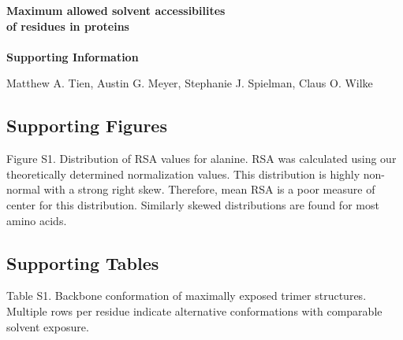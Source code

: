 \documentclass[12pt]{article}
\begin{document}
\begin{center}
\Large\textbf{Maximum allowed solvent accessibilites\\of residues in proteins}\\
\large\mbox{}\\
\textbf{Supporting Information}
\end{center}

\bigskip
\begin{center}
Matthew A. Tien, Austin G. Meyer, Stephanie J. Spielman, Claus O. Wilke
\end{center}
\bigskip

\subsection*{Supporting Figures}

\noindent Figure S1. Distribution of RSA values for alanine. RSA was calculated using our theoretically determined normalization values. This distribution is highly non-normal with a strong right skew. Therefore, mean RSA is a poor measure of center for this distribution. Similarly skewed distributions are found for most amino acids.




\newpage
\subsection*{Supporting Tables}

\noindent Table S1. Backbone conformation of maximally exposed trimer structures. Multiple rows per residue indicate alternative conformations with comparable solvent exposure.
\end{document}
